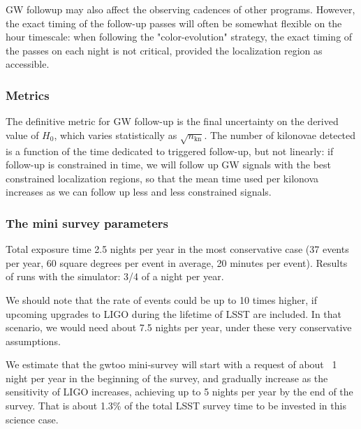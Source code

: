 GW followup may also affect the observing cadences of other programs. However, the exact timing of the follow-up passes will often be somewhat flexible on the hour timescale: when following the "color-evolution" strategy, the exact timing of the passes on each night is not critical, provided the localization region as accessible.


\subsubsection{Metrics}

The definitive metric for GW follow-up is the final uncertainty on the derived value of $H_0$, which varies statistically as $\sqrt{n_{\mbox{kn}}}$. The number of kilonovae detected is a function of the time dedicated to triggered follow-up, but not linearly: if follow-up is constrained in time, we will follow up GW signals with the best constrained localization regions, so that the mean time used per kilonova increases as we can follow up less and less constrained signals.




\subsubsection{The mini survey parameters}

Total exposure time 2.5 nights per year in the most conservative case (37 events per year, 60 square degrees per event in average, 20 minutes per event). 
Results of runs with the simulator: 3/4 of a night per year.

We should note that the rate of events could be up to 10 times higher, if upcoming upgrades to LIGO during the lifetime of LSST are included. In that scenario, we would need about 7.5 nights per year, under these very conservative assumptions.

We estimate that the gwtoo mini-survey will start with a request of about ~1 night per year in the beginning of the survey, and gradually increase as the sensitivity of LIGO increases, achieving  up to 5 nights per year by the end of the survey. That is about 1.3\% of the total LSST survey time to be invested in this science case. 
